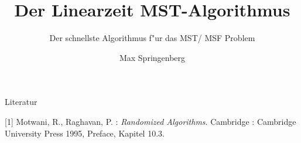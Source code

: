 \documentclass[10pt]{beamer}
\title{Der Linearzeit MST-Algorithmus}
\subtitle{Der schnellste Algorithmus f"ur das MST/ MSF Problem}
\date{}
\author{Max Springenberg}
\institute{Proseminar: Randomisierte Algorithmen, TU Dortmund}
\begin{document}
\maketitle



%



%





%






\begin{frame}{Literatur}
    \begin{thebibliography}{}
    \footnotesize
        [1] Motwani, R., Raghavan, P. :
        \textit{Randomized Algorithms}. Cambridge :
        Cambridge University Press 1995, Preface, Kapitel 10.3.
    \end{thebibliography}
\end{frame}
\end{document}
